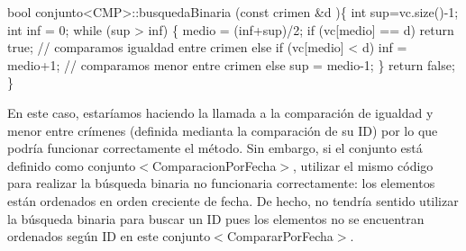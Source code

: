\begin{DoxyCode}
\textcolor{keywordtype}{bool} conjunto<CMP>::busquedaBinaria (\textcolor{keyword}{const} crimen &d )\{
    \textcolor{keywordtype}{int} sup=vc.size()-1;
    \textcolor{keywordtype}{int} inf = 0;
    \textcolor{keywordflow}{while} (sup > inf) \{
      medio = (inf+sup)/2;
      \textcolor{keywordflow}{if} (vc[medio] == d) \textcolor{keywordflow}{return} \textcolor{keyword}{true};  \textcolor{comment}{// comparamos igualdad entre crimen}
      \textcolor{keywordflow}{else} \textcolor{keywordflow}{if} (vc[medio] < d) inf = medio+1; \textcolor{comment}{// comparamos menor entre crimen}
      \textcolor{keywordflow}{else} sup = medio-1;
    \}
    \textcolor{keywordflow}{return} \textcolor{keyword}{false};
\}
\end{DoxyCode}
 En este caso, estaríamos haciendo la llamada a la comparación de igualdad y menor entre crímenes (definida medianta la comparación de su I\-D) por lo que podría funcionar correctamente el método. Sin embargo, si el conjunto está definido como conjunto$<$\-Comparacion\-Por\-Fecha$>$, utilizar el mismo código para realizar la búsqueda binaria no funcionaria correctamente\-: los elementos están ordenados en orden creciente de fecha. De hecho, no tendría sentido utilizar la búsqueda binaria para buscar un I\-D pues los elementos no se encuentran ordenados según I\-D en este conjunto$<$\-Comparar\-Por\-Fecha$>$.

